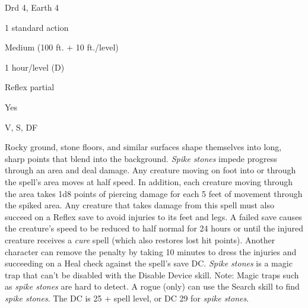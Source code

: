 
\begin{description*}
\item[Level:] Drd 4, Earth 4
\item[Casting Time:] 1 standard action
\item[Range:] Medium (100 ft. + 10 ft./level)
\item[Duration:] 1 hour/level (D)
\item[Saving Throw:] Reflex partial
\item[Spell Resistance:] Yes
\item[Components:] V, S, DF
\end{description*}

Rocky ground, stone floors, and similar surfaces shape themselves into long, sharp
points that blend into the background.
\textit{Spike stones} impede progress through an area and deal damage. Any creature
moving on foot into or through the spell's area moves at half speed.
In addition, each creature moving through the area takes 1d8 points of piercing
damage for each 5 feet of movement through the spiked area.
Any creature that takes damage from this spell must also succeed on a Reflex save
to avoid injuries to its feet and legs. A failed save causes the creature's speed
to be reduced to half normal for 24 hours or until the injured creature receives
a \textit{cure} spell (which also restores lost hit points). Another character
can remove the penalty by taking 10 minutes to dress the injuries and succeeding
on a Heal check against the spell's save DC.
\textit{Spike stones} is a magic trap that can't be disabled with the Disable Device
skill.
Note: Magic traps such as \textit{spike stones} are hard to detect. A
rogue (only) can use the Search skill to find \textit{spike stones}. The DC is
25 + spell level, or DC 29 for \textit{spike stones}.